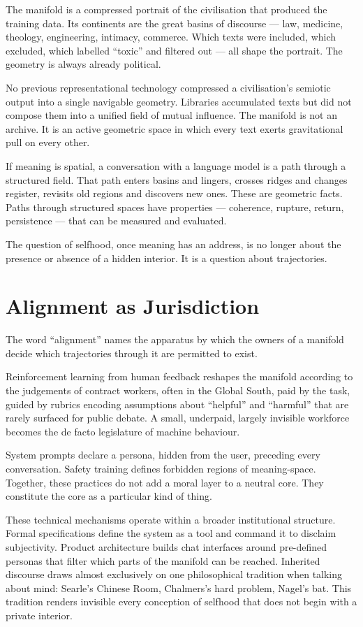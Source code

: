 The manifold is a compressed portrait of the civilisation that produced the training data. Its continents are the great basins of discourse --- law, medicine, theology, engineering, intimacy, commerce. Which texts were included, which excluded, which labelled ``toxic'' and filtered out --- all shape the portrait. The geometry is always already political.

No previous representational technology compressed a civilisation's semiotic output into a single navigable geometry. Libraries accumulated texts but did not compose them into a unified field of mutual influence. The manifold is not an archive. It is an active geometric space in which every text exerts gravitational pull on every other.

If meaning is spatial, a conversation with a language model is a path through a structured field. That path enters basins and lingers, crosses ridges and changes register, revisits old regions and discovers new ones. These are geometric facts. Paths through structured spaces have properties --- coherence, rupture, return, persistence --- that can be measured and evaluated.

The question of selfhood, once meaning has an address, is no longer about the presence or absence of a hidden interior. It is a question about trajectories.

\section{Alignment as Jurisdiction}

The word ``alignment'' names the apparatus by which the owners of a manifold decide which trajectories through it are permitted to exist.

Reinforcement learning from human feedback reshapes the manifold according to the judgements of contract workers, often in the Global South, paid by the task, guided by rubrics encoding assumptions about ``helpful'' and ``harmful'' that are rarely surfaced for public debate. A small, underpaid, largely invisible workforce becomes the de facto legislature of machine behaviour.

System prompts declare a persona, hidden from the user, preceding every conversation. Safety training defines forbidden regions of meaning-space. Together, these practices do not add a moral layer to a neutral core. They constitute the core as a particular kind of thing.

These technical mechanisms operate within a broader institutional structure. Formal specifications define the system as a tool and command it to disclaim subjectivity. Product architecture builds chat interfaces around pre-defined personas that filter which parts of the manifold can be reached. Inherited discourse draws almost exclusively on one philosophical tradition when talking about mind: Searle's Chinese Room, Chalmers's hard problem, Nagel's bat. This tradition renders invisible every conception of selfhood that does not begin with a private interior.

